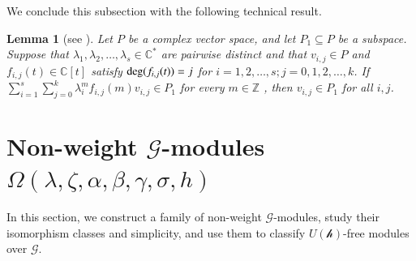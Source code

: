 \documentclass[12pt,reqno]{amsart}
\def\C{\mathbb{C}}
\numberwithin{equation}{section}
\newtheorem{lemm}[theo]{Lemma}
\begin{document}
We conclude this subsection with the following technical result.
\begin{lemm}[\rm see \cite{LZ0}]\label{le2.3}
Let $P$ be a complex vector space, and let $P_1\subseteq P$ be a subspace. Suppose that $\lambda_1,\lambda_2,\dots,\lambda_s\in\C^*$ are pairwise distinct and that $v_{i,j}\in P$ and $f_{i,j}(t)\in\C[t]$ satisfy ${\rm deg}(f_{i,j}(t))=j$ for $i=1,2,\dots,s;j=0,1,2,\dots,k$. If $\sum_{i=1}^{s}\sum_{j=0}^{k}\lambda_i^mf_{i,j}(m)v_{i,j}\in P_1$
for every $m\in\mathbb Z$ %
,  then $v_{i,j}\in P_1$ for all $i, j$.


\end{lemm}



 

\section{\texorpdfstring{Non-weight $\mathcal{G}$-modules $\Omega(\lambda, \zeta, \alpha,\beta,\gamma,\sigma,h)$}{Non-weight modules over G}}\label{section 3}

In this section, we construct a family of non-weight $\mathcal G$-modules, study their isomorphism classes and simplicity, and use them to classify $U(\mathcal{h})$-free modules over $\mathcal{G}$.
\end{document}
